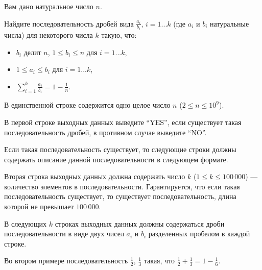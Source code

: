 
\Legend
Вам дано натуральное число $n$.

Найдите последовательность дробей вида $\frac{a_i}{b_i}$, $i = 1...k$
(где $a_i$ и $b_i$ натуральные числа) для некоторого числа $k$ такую, что:

\begin{itemize}
	\item $b_i$ делит $n$, $1 \le b_i \le n$ для $i = 1...k$,
	\item $1 \le a_i \le b_i$ для $i = 1...k$,
	\item $\sum_{i = 1}^{k} \frac{a_i}{b_i} = 1 - \frac{1}{n}$.
\end{itemize}

\Input
В единственной строке содержится одно целое число $n$ ($2 \le n \le 10^9$).

\Output
В первой строке выходных данных выведите ``YES'', если существует такая последовательность дробей, в противном случае выведите ``NO''.

Если такая последовательность существует, то следующие строки должны содержать описание данной последовательности в следующем формате.

Вторая строка выходных данных должна содержать число $k$ ($1 \le k \le 100\,000$) --- количество элементов в последовательности.
Гарантируется, что если такая последовательность существует, то существует последовательность, длина которой не превышает $100\,000$.

В следующих $k$ строках выходных данных должны содержаться дроби последовательности в виде двух чисел $a_i$ и $b_i$ разделенных пробелом в каждой строке.

\Samples
\BeginTests
{}
\EndTests

Во втором примере последовательность $\frac{1}{2}$, $\frac{1}{3}$ такая, что $\frac{1}{2} + \frac{1}{3} = 1 - \frac{1}{6}$.

\EndProblem
